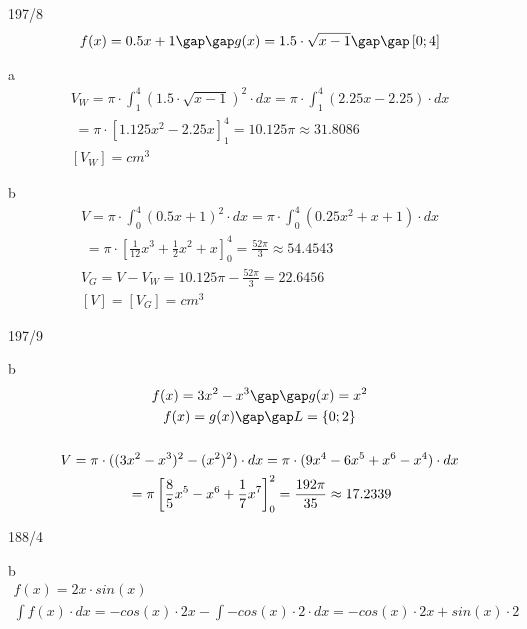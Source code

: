 \begin{exercise}{197/8}
  \begin{gather*}
    f(x) = 0.5x + 1 \gap\gap g(x) = 1.5 \cdot \sqrt{x - 1} \gap\gap \left[0; 4\right]
  \end{gather*}
  \item [a]
  \begin{gather*}
    V_W = \pi \cdot \int_1^4 (1.5 \cdot \sqrt{x - 1})^2 \cdot dx = \pi \cdot \int_1^4 (2.25x - 2.25) \cdot dx \\
    \;= \pi \cdot \left[1.125x^2 - 2.25x\right]_1^4 = 10.125\pi \approx 31.8086 \\
    [V_W] = cm^3
  \end{gather*}
  \item [b]
  \begin{gather*}
    V = \pi \cdot \int_0^4 (0.5x + 1)^2 \cdot dx = \pi \cdot \int_0^4 (0.25x^2 + x + 1) \cdot dx \\
    \;= \pi \cdot \left[\frac{1}{12}x^3 + \frac{1}{2}x^2 + x\right]_0^4 = \frac{52\pi}{3} \approx 54.4543 \\
    V_G = V - V_W = 10.125\pi - \frac{52\pi}{3} = 22.6456 \\
    [V] = [V_G] = cm^3
  \end{gather*}
\end{exercise}
\begin{exercise}{197/9}
  \item [b]
  \begin{gather*}
    f(x) = 3x^2 - x^3 \gap\gap g(x) = x^2 \\
    f(x) = g(x) \gap\gap L = \{0; 2\} \\\\
    V = \pi \cdot ((3x^2 - x^3)^2 - (x^2)^2) \cdot dx = \pi \cdot (9x^4 - 6x^5 + x^6 - x^4) \cdot dx \\
    \;= \pi \left[\frac{8}{5}x^5 - x^6 + \frac{1}{7}x^7\right]_0^2 = \frac{192\pi}{35} \approx 17.2339
  \end{gather*}
\end{exercise}
\begin{exercise}{188/4}
  \item [b]
  \begin{gather*}
    f(x) = 2x \cdot sin(x) \\
    \int f(x) \cdot dx = -cos(x) \cdot 2x - \int -cos(x) \cdot 2 \cdot dx = -cos(x) \cdot 2x + sin(x) \cdot 2
  \end{gather*}
\end{exercise}
